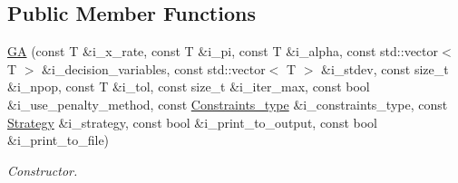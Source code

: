 \subsection*{Public Member Functions}
\begin{DoxyCompactItemize}
\item 
\hyperlink{structea_1_1_g_a_a5a8abc8d099a169a0c141079552be2c3}{GA} (const T \&i\+\_\+x\+\_\+rate, const T \&i\+\_\+pi, const T \&i\+\_\+alpha, const std\+::vector$<$ T $>$ \&i\+\_\+decision\+\_\+variables, const std\+::vector$<$ T $>$ \&i\+\_\+stdev, const size\+\_\+t \&i\+\_\+npop, const T \&i\+\_\+tol, const size\+\_\+t \&i\+\_\+iter\+\_\+max, const bool \&i\+\_\+use\+\_\+penalty\+\_\+method, const \hyperlink{namespaceutilities_ab1a1517bf6e62a1acfab5293ca8985c1}{Constraints\+\_\+type} \&i\+\_\+constraints\+\_\+type, const \hyperlink{namespaceea_a8e369877773b4db67b8512efdb4f8f89}{Strategy} \&i\+\_\+strategy, const bool \&i\+\_\+print\+\_\+to\+\_\+output, const bool \&i\+\_\+print\+\_\+to\+\_\+file)
\begin{DoxyCompactList}\small\item\em Constructor. \end{DoxyCompactList}\end{DoxyCompactItemize}
